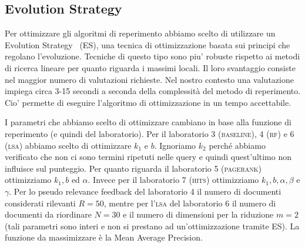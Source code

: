 \subsection{Evolution Strategy}
\label{sec:es}

Per ottimizzare gli algoritmi di reperimento abbiamo scelto di utilizzare un Evolution Strategy~\cite{back1996evolutionary} (ES), una tecnica di ottimizzazione basata sui principi che regolano l'evoluzione. Tecniche di questo tipo sono piu' robuste rispetto ai metodi di ricerca lineare per quanto riguarda i massimi locali. Il loro svantaggio consiste nel maggior numero di valutazioni richieste. Nel nostro contesto una valutazione impiega circa 3-15 secondi a seconda della complessit\`a del metodo di reperimento. Cio' permette di eseguire l'algoritmo di ottimizzazione in un tempo accettabile.

I parametri che abbiamo scelto di ottimizzare cambiano in base alla funzione di reperimento (e quindi del laboratorio). Per il laboratorio 3 (\textsc{baseline}), 4 (\textsc{rf}) e 6 (\textsc{lsa}) abbiamo scelto di ottimizzare $k_1$ e $b$. Ignoriamo $k_2$ perch\'e abbiamo verificato che non ci sono termini ripetuti nelle query e quindi  quest'ultimo non influisce sul punteggio. Per quanto riguarda il laboratorio 5 (\textsc{pagerank}) ottimizziamo $k_1, b$ ed $\alpha$. Invece per il laboratorio 7 (\textsc{hits}) ottimizziamo $k_1, b, \alpha, \beta$ e $\gamma$. Per lo pseudo relevance feedback del laboratorio 4 il numero di documenti considerati rilevanti $R = 50$, mentre per l'\textsc{lsa} del laboratorio 6 il numero di documenti da riordinare $N = 30$ e il numero di dimensioni per la riduzione $m=2$ (tali parametri sono interi e non si prestano ad un'ottimizzazione tramite ES). La funzione da massimizzare \`e la Mean Average Precision.

